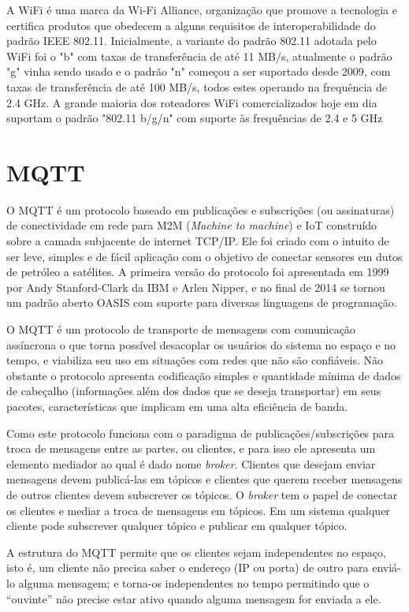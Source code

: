 A \acf{WiFi} é uma marca da Wi-Fi Alliance, organização que promove a tecnologia e certifica produtos que obedecem a alguns requisitos de interoperabilidade do padrão \ac{IEEE} 802.11. Inicialmente, a variante do padrão 802.11 adotada pelo WiFi foi o "b" com taxas de transferência de até 11 MB/s, atualmente o padrão "g" vinha sendo usado e o padrão "n" começou a ser suportado desde 2009, com taxas de transferência de até 100 MB/s, todos estes operando na frequência de 2.4 GHz. A grande maioria dos roteadores WiFi comercializados hoje em dia suportam o padrão "802.11 b/g/n" com suporte às frequências de 2.4 e 5 GHz 

\section{\ac{MQTT}}

O \acf{MQTT} é um protocolo baseado em publicações e subscrições (ou assinaturas) de conectividade em rede para M2M (\textit{Machine to machine}) e \ac{IoT} construído sobre a camada subjacente de internet \ac{TCP}/\ac{IP}. Ele foi criado com o intuito de ser leve, simples e de fácil aplicação com o objetivo de conectar sensores em dutos de petróleo a satélites. A primeira versão do protocolo foi apresentada em 1999 por Andy Stanford-Clark da IBM e Arlen Nipper, e no final de 2014 se tornou um padrão aberto OASIS \cite{oasis} com suporte para diversas linguagens de programação.

O MQTT é um protocolo de transporte de mensagens com comunicação assíncrona o que torna possível desacoplar os usuários do sistema no espaço e no tempo, e viabiliza seu uso em situações com redes que não são confiáveis. Não obstante o protocolo apresenta codificação simples e quantidade mínima de dados de cabeçalho (informações além dos dados que se deseja transportar) em seus pacotes, características que implicam em uma alta eficiência de banda.

Como este protocolo funciona com o paradigma de publicações/subscrições para troca de mensagens entre as partes, ou clientes, e para isso ele apresenta um elemento mediador ao qual é dado nome \textit{broker}. Clientes que desejam enviar mensagens devem publicá-las em tópicos e clientes que querem receber mensagens de outros clientes devem subscrever os tópicos. O \textit{broker} tem o papel de conectar os clientes e mediar a troca de mensagens em tópicos. Em um sistema qualquer cliente pode subscrever qualquer tópico e publicar em qualquer tópico.

A estrutura do MQTT permite que os clientes sejam independentes no espaço, isto é, um cliente não precisa saber o endereço (IP ou porta) de outro para enviá-lo alguma mensagem; e torna-os independentes no tempo permitindo que o “ouvinte” não precise estar ativo quando alguma mensagem for enviada a ele.

